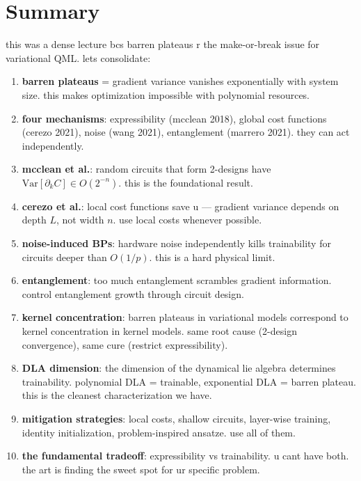 \documentclass[11pt,a4paper]{article}
\theoremstyle{definition}
\theoremstyle{remark}
\begin{document}
\section{Summary}

this was a dense lecture bcs barren plateaus r the make-or-break issue for variational QML. lets consolidate:

\begin{enumerate}[label=\arabic*.]
    \item \textbf{barren plateaus} = gradient variance vanishes exponentially with system size. this makes optimization impossible with polynomial resources.

    \item \textbf{four mechanisms}: expressibility (mcclean 2018), global cost functions (cerezo 2021), noise (wang 2021), entanglement (marrero 2021). they can act independently.

    \item \textbf{mcclean et al.}: random circuits that form 2-designs have $\text{Var}[\partial_k C] \in O(2^{-n})$. this is the foundational result.

    \item \textbf{cerezo et al.}: local cost functions save u --- gradient variance depends on depth $L$, not width $n$. use local costs whenever possible.

    \item \textbf{noise-induced BPs}: hardware noise independently kills trainability for circuits deeper than $O(1/p)$. this is a hard physical limit.

    \item \textbf{entanglement}: too much entanglement scrambles gradient information. control entanglement growth through circuit design.

    \item \textbf{kernel concentration}: barren plateaus in variational models correspond to kernel concentration in kernel models. same root cause (2-design convergence), same cure (restrict expressibility).

    \item \textbf{DLA dimension}: the dimension of the dynamical lie algebra determines trainability. polynomial DLA = trainable, exponential DLA = barren plateau. this is the cleanest characterization we have.

    \item \textbf{mitigation strategies}: local costs, shallow circuits, layer-wise training, identity initialization, problem-inspired ansatze. use all of them.

    \item \textbf{the fundamental tradeoff}: expressibility vs trainability. u cant have both. the art is finding the sweet spot for ur specific problem.
\end{enumerate}
\end{document}
